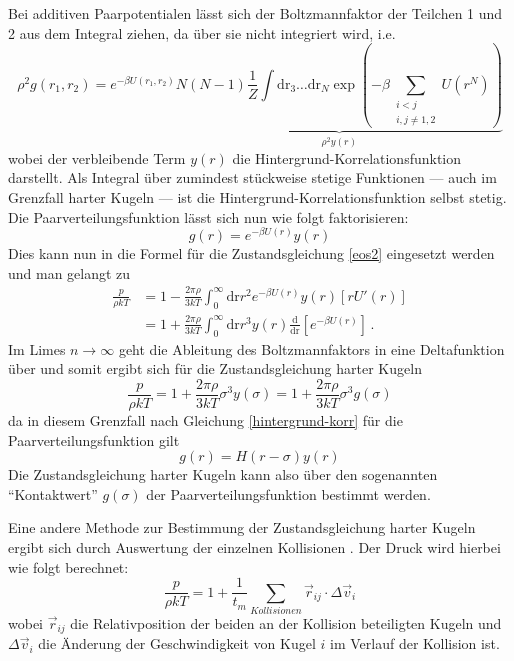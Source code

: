 Bei additiven Paarpotentialen lässt sich der Boltzmannfaktor der Teilchen 1 und 2 aus dem Integral ziehen, da über sie nicht integriert wird, i.e. 
\begin{equation}
\rho^2 g(r_1, r_2) = e^{-\beta U(r_1, r_2)} \underbrace{N(N-1) \frac{1}{Z} \int \text{dr}_3 \ldots \text{dr}_N \exp{\left(-\beta \sum\limits_{\substack{i<j \\ i,j \neq {1,2}}} U(r^N)\right)}}_{\rho^2 y(r)}
\end{equation}
wobei der verbleibende Term $y(r)$ die Hintergrund-Korrelationsfunktion darstellt. Als Integral über zumindest stückweise stetige Funktionen --- auch im Grenzfall harter Kugeln --- ist die Hintergrund-Korrelationsfunktion selbst stetig. Die Paarverteilungsfunktion lässt sich nun wie folgt faktorisieren:
\begin{equation}
g(r) = e^{-\beta U(r)} y(r)
\label{hintergrund-korr}
\end{equation}
Dies kann nun in die Formel für die Zustandsgleichung \ref{eos2} eingesetzt werden und man gelangt zu
\begin{align*}
\frac{p}{\rho k T} &= 1 - \frac{2\pi\rho}{3kT} \int_0^{\infty} \text{dr} r^2 e^{-\beta U(r)} y(r) \left[ r U'(r) \right] \\ 
&= 1 + \frac{2\pi\rho}{3kT} \int_0^{\infty} \text{dr} r^3 y(r) \frac{\text{d}}{\text{dr}} \left[ e^{-\beta U(r)} \right] \, .
\end{align*}
Im Limes $n \rightarrow \infty$ geht die Ableitung des Boltzmannfaktors in eine Deltafunktion über und somit ergibt sich für die Zustandsgleichung harter Kugeln
\begin{equation}
\frac{p}{\rho k T} = 1 + \frac{2\pi\rho}{3kT} \sigma^3 y(\sigma) = 1 + \frac{2\pi\rho}{3kT} \sigma^3 g(\sigma)
\end{equation} 
da in diesem Grenzfall nach Gleichung \ref{hintergrund-korr} für die Paarverteilungsfunktion gilt
\begin{equation}
g(r) = H(r-\sigma)y(r) 
\end{equation}  
Die Zustandsgleichung harter Kugeln kann also über den sogenannten "`Kontaktwert"' $g(\sigma)$ der Paarverteilungsfunktion bestimmt werden. 

Eine andere Methode zur Bestimmung der Zustandsgleichung harter Kugeln ergibt sich durch Auswertung der einzelnen Kollisionen \cite{Erpenbeck1977}. Der Druck wird hierbei wie folgt berechnet: 
\begin{equation}
\frac{p}{\rho k T} = 1 + \frac{1}{t_m} \sum_{Kollisionen} \vec{r}_{ij} \cdot \Delta \vec{v}_i
\end{equation}
wobei $\vec{r}_{ij}$ die Relativposition der beiden an der Kollision beteiligten Kugeln und $\Delta \vec{v}_i$ die Änderung der Geschwindigkeit von Kugel $i$ im Verlauf der Kollision ist.
   
